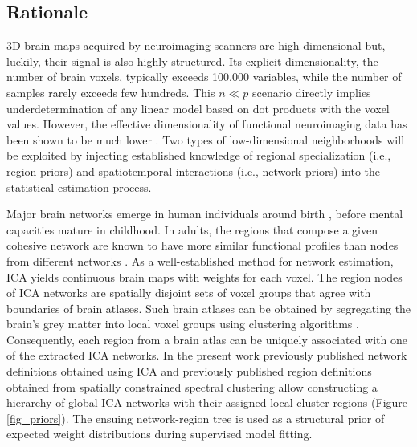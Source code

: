 \documentclass{article}
\begin{document}
\subsection{Rationale}
3D brain maps acquired by neuroimaging
scanners are high-dimensional but, luckily,
their signal is also highly structured.
Its explicit dimensionality, the number of brain voxels,
typically exceeds 100,000 variables, while the number
of samples rarely exceeds few hundreds.
This $n \ll p$ scenario directly implies underdetermination of any
linear model based on dot products with the voxel values.
However, the effective dimensionality of functional neuroimaging data has been
shown to be much lower \cite{bzdok2015semi}.
Two types of low-dimensional neighborhoods will be exploited by
injecting established knowledge of regional specialization
(i.e., region priors)
and spatiotemporal interactions
(i.e., network priors)
into the statistical estimation process.



Major brain networks emerge in human individuals around birth
\cite{doria2010}, before mental capacities mature in childhood. 
In adults,
the regions that compose
a given cohesive network are known to have more
similar functional profiles than nodes from different networks
\cite{anderson2013}.
As a well-established method for network estimation,
ICA \cite{beckmann2005} yields continuous brain maps with
weights for each voxel. The region nodes of ICA
networks are spatially disjoint sets of voxel groups that
agree with boundaries of brain atlases.
Such brain atlases can be obtained by segregating
the brain's grey matter into local voxel groups
using clustering algorithms
\cite{cbp2015review}.
Consequently,
each region from a brain atlas can be uniquely associated with one of
the extracted ICA networks.
%
In the present work previously published network definitions
obtained using ICA \cite{smith2009}
and
previously published region definitions obtained from
spatially constrained spectral clustering \cite{crad12}
allow constructing a hierarchy of global ICA networks with their
assigned local cluster regions
(Figure \ref{fig_priors}).
The ensuing network-region tree is used as a structural prior
of expected weight distributions
during supervised model fitting.
\end{document}
